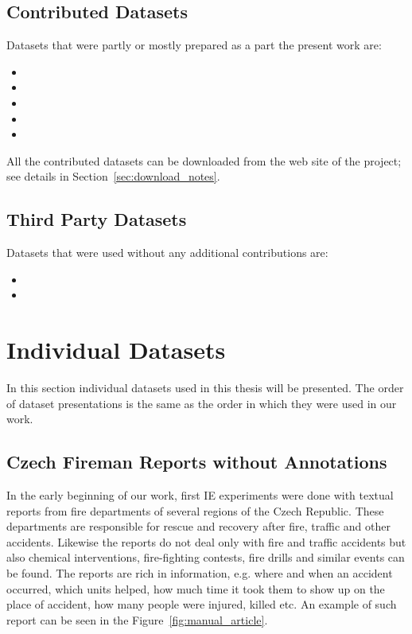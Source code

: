 \subsection{Contributed Datasets}
Datasets that were partly or mostly prepared as a part the present work are:


\begin{itemize}
	\item {}
	\item {}
	\item {}
	\item {}
	\item {}
\end{itemize}

All the contributed datasets can be downloaded from the web site of the project; see details in Section~\ref{sec:download_notes}.

\subsection{Third Party Datasets}

Datasets that were used without any additional contributions are:

\begin{itemize}
	\item {}
	\item {}
\end{itemize}


\section{Individual Datasets}
In this section individual datasets used in this thesis will be presented. The order of dataset presentations is the same as the order in which they were used in our work.

\subsection{Czech Fireman Reports without Annotations} \label{sec:data_fireman_without}
In the early beginning of our work, first IE experiments were done with textual reports from fire departments of several regions of the Czech Republic. These departments are responsible for rescue and recovery after fire, traffic and other accidents. Likewise the reports do not deal only with fire and traffic accidents but also chemical interventions, fire-fighting contests, fire drills and similar events can be found. The reports are rich in information, e.g. where and when an accident occurred, which units helped, how much time it took them to show up on the place of accident, how many people were injured, killed etc. An example of such report can be seen in the Figure~\ref{fig:manual_article}.

